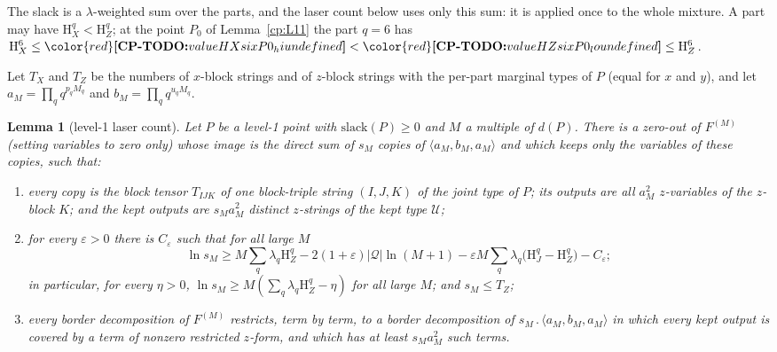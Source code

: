 \documentclass[11pt]{article}
\makeatletter
\newtheorem{lemma}[theorem]{Lemma}
\theoremstyle{definition}
\theoremstyle{remark}
\DeclareRobustCommand{\CPTODO}[1]{{\color{red}\textbf{[CP-TODO:} #1\textbf{]}}}
\providecommand{\eps}{\varepsilon}
\newcommand{\abs}[1]{\lvert #1\rvert}
\newcommand{\Ent}{\mathrm{H}}                 %
\newcommand{\mat}[3]{\langle #1,#2,#3\rangle} %
\newcommand{\cp}{\mathbin{.}}                 %
\newcommand{\Qs}{\mathcal{Q}}                 %
\newcommand{\slack}{\mathrm{slack}}           %
\newcommand{\Pzero}{P_0}                      %
\newcommand{\Ukept}{\mathcal{U}}              %
\newcommand{\cpv}[1]{\ifcsname cpv@#1\endcsname\csname cpv@#1\endcsname\else\CPTODO{value #1 undefined}\fi}
\makeatother
\begin{document}
The slack is a $\lambda$-weighted sum over the parts, and the laser count below uses only this sum: it is applied once to the whole mixture. A part may have $\Ent^q_X<\Ent^q_Z$; at the point $\Pzero$ of Lemma~\ref{cp:L11} the part $q=6$ has $\Ent^6_X\le\cpv{HXsixP0_hi}<\cpv{HZsixP0_lo}\le\Ent^6_Z$.

Let $T_X$ and $T_Z$ be the numbers of $x$-block strings and of $z$-block strings with the per-part marginal types of $P$ (equal for $x$ and $y$), and let $a_M=\prod_qq^{p_qM_q}$ and $b_M=\prod_qq^{u_qM_q}$.

\begin{lemma}[level-1 laser count]\label{cp:L4}
Let $P$ be a level-1 point with $\slack(P)\ge0$ and $M$ a multiple of $d(P)$. There is a zero-out of $F^{(M)}$ (setting variables to zero only) whose image is the direct sum of $s_M$ copies of $\mat{a_M}{b_M}{a_M}$ and which keeps only the variables of these copies, such that:
\begin{enumerate}[label=(\roman*)]
\item every copy is the block tensor $T_{IJK}$ of one block-triple string $(I,J,K)$ of the joint type of $P$; its outputs are all $a_M^2$ $z$-variables of the $z$-block $K$; and the kept outputs are $s_Ma_M^2$ distinct $z$-strings of the kept type $\Ukept$;
\item for every $\eps>0$ there is $C_\eps$ such that for all large $M$
\[
\ln s_M\ge M\sum_q\lambda_q\Ent^q_Z-2(1+\eps)\abs\Qs\ln(M+1)-\eps M\sum_q\lambda_q\bigl(\Ent^q_J-\Ent^q_Z\bigr)-C_\eps;
\]
in particular, for every $\eta>0$, $\ln s_M\ge M(\sum_q\lambda_q\Ent^q_Z-\eta)$ for all large $M$; and $s_M\le T_Z$;
\item every border decomposition of $F^{(M)}$ restricts, term by term, to a border decomposition of $s_M\cp\mat{a_M}{b_M}{a_M}$ in which every kept output is covered by a term of nonzero restricted $z$-form, and which has at least $s_Ma_M^2$ such terms.
\end{enumerate}
\end{lemma}
\end{document}

